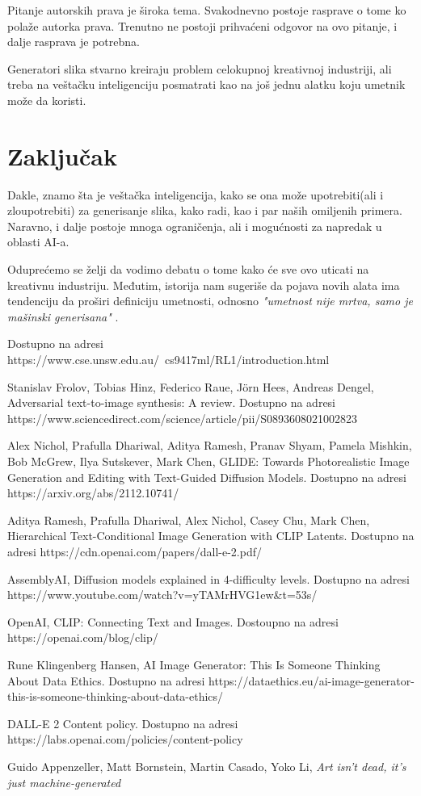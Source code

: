 \documentclass[12pt, letterpaper]{article}
\begin{document}
Pitanje autorskih prava je široka tema. Svakodnevno postoje rasprave o tome ko polaže autorka prava. Trenutno ne postoji prihvaćeni odgovor na ovo pitanje, i dalje rasprava je potrebna. 

Generatori slika stvarno kreiraju problem celokupnoj kreativnoj industriji, ali treba na veštačku inteligenciju posmatrati kao na još jednu alatku koju umetnik može da koristi.

\section{Zaključak}

Dakle, znamo šta je veštačka inteligencija, kako se ona može upotrebiti(ali i zloupotrebiti) za generisanje slika, kako radi, kao i par naših omiljenih primera. Naravno, i dalje postoje mnoga ograničenja, ali i mogućnosti za napredak u oblasti AI-a. 

Oduprećemo se želji da vodimo debatu o tome kako će sve ovo uticati na kreativnu industriju. Međutim, istorija nam sugeriše da pojava novih alata ima tendenciju da proširi definiciju umetnosti, odnosno \textit{"umetnost nije mrtva, samo je mašinski generisana"} \cite{clanaknov}.

\begin{thebibliography}{10}

 Dostupno na adresi https://www.cse.unsw.edu.au/~cs9417ml/RL1/introduction.html 

 Stanislav Frolov, Tobias Hinz, Federico Raue, Jörn Hees, Andreas Dengel, Adversarial text-to-image synthesis: A review. Dostupno na adresi https://www.sciencedirect.com/science/article/pii/S0893608021002823

 Alex Nichol, Prafulla Dhariwal, Aditya Ramesh, Pranav Shyam, Pamela Mishkin, Bob McGrew, Ilya Sutskever, Mark Chen, GLIDE: Towards Photorealistic Image Generation and Editing with Text-Guided Diffusion Models. Dostupno na adresi https://arxiv.org/abs/2112.10741/

 Aditya Ramesh, Prafulla Dhariwal, Alex Nichol, Casey Chu, Mark Chen, Hierarchical Text-Conditional
Image Generation with CLIP Latents. Dostupno na adresi https://cdn.openai.com/papers/dall-e-2.pdf/

 AssemblyAI, Diffusion models explained in 4-difficulty levels. Dostupno na adresi https://www.youtube.com/watch?v=yTAMrHVG1ew\&t=53s/

 OpenAI, CLIP: Connecting
Text and Images. Dostoupno na adresi https://openai.com/blog/clip/

 Rune Klingenberg Hansen, AI Image Generator: This Is Someone Thinking About Data Ethics. Dostupno na adresi https://dataethics.eu/ai-image-generator-this-is-someone-thinking-about-data-ethics/

 DALL-E 2 Content policy. Dostupno na adresi https://labs.openai.com/policies/content-policy

 Guido Appenzeller, Matt Bornstein, Martin Casado, Yoko Li, \textit{Art isn't dead, it's just machine-generated}

\end{thebibliography}
\end{document}
